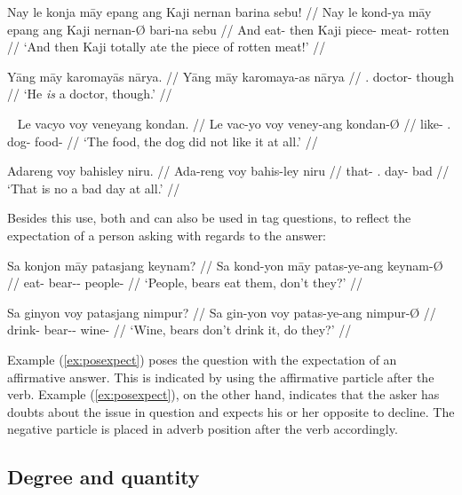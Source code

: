 \pex\label{ex:maayintens}
\a\begingl
	\gla Nay le konja māy epang ang Kaji nernan barina sebu! //
	\glb Nay le kond-ya māy epang ang Kaji nernan-Ø bari-na sebu //
	\glc And \PatTI{} eat-\TsgM{} \Int{} then \Aarg{} Kaji piece-\Top{} 
		meat-\Gen{} rotten //
	\glft `And then Kaji totally ate the piece of rotten meat!' //
\endgl

\a\begingl
	\gla Yāng māy karomayās nārya. //
	\glb Yāng māy karomaya-as nārya //
	\glc \TsgM{}.\Aarg{} \Int{} doctor-\Parg{} though // 
	\glft `He \emph{is} a doctor, though.' //
\endgl
\xe

\pex~\label{ex:voyintens}
\a\begingl
	\gla Le vacyo voy veneyang kondan. //
	\glb Le vac-yo voy veney-ang kondan-Ø //
	\glc \PatTI{} like-\TsgN{} \Int{}.\Neg{} dog-\Aarg{} food-\Top{} //
	\glft `The food, the dog did not like it at all.' //
\endgl

\a\begingl
	\gla Adareng voy bahisley niru. //
	\glb Ada-reng voy bahis-ley niru //
	\glc that-\AargI{} \Int{}.\Neg{} day-\PargI{} bad // 
	\glft `That is no a bad day at all.' //
\endgl
\xe

Besides this use, both  and  can also be used in
tag questions, to reflect the expectation of a person asking with regards to
the answer:

\pex
\a\label{ex:posexpect}\begingl
	\gla Sa konjon māy patasjang keynam? //
	\glb Sa kond-yon māy patas-ye-ang keynam-Ø //
	\glc \PatT{} eat-\TplN{} \Aff{} bear-\Pl{}-\Aarg{} people-\Top{} //
	\glft `People, bears eat them, don't they?' //
\endgl

\a\label{ex:negexpect}\begingl
	\gla Sa ginyon voy patasjang nimpur? //
	\glb Sa gin-yon voy patas-ye-ang nimpur-Ø //
	\glc \PatT{} drink-\TplN{} \Neg{} bear-\Pl{}-\Aarg{} wine-\Top{} //
	\glft `Wine, bears don't drink it, do they?' //
\endgl
\xe

Example (\ref{ex:posexpect}) poses the question with the expectation of an 
affirmative answer. This is indicated by using the affirmative particle 
 after the verb. Example (\ref{ex:posexpect}), on the other 
hand, indicates that the asker has doubts about the issue in question and 
expects his or her opposite to decline. The negative particle  
is placed in adverb position after the verb accordingly.


\subsection{Degree and quantity}

